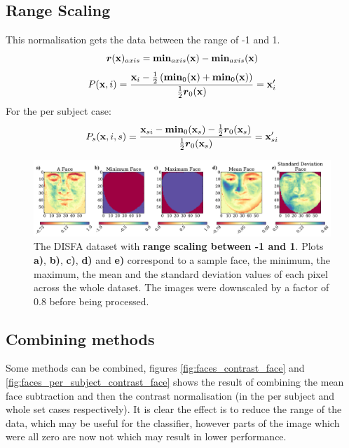     \subsection{Range Scaling}
      This normalisation gets the data between the range of -1 and 1.
      \begin{equation}
        {\boldsymbol r}({\bf x})_{axis} = {\boldsymbol \min}_{axis}({\bf x}) - {\boldsymbol \min}_{axis}({\bf x})
      \end{equation}
      \begin{equation}
         P({\bf x},i) =
         \frac{{\bf x}_{i} - \frac{1}{2}\left ( {\boldsymbol \min}_0({\bf x}) + {\boldsymbol \min}_0({\bf x}) \right ) }{\frac{1}{2}{\boldsymbol r}_0({\bf x})}
         = {\bf x}_{i}'
      \end{equation}
      For the per subject case:
      \begin{equation}
         P_s({\bf x},i,s) =
         \frac{{\bf x}_{si} - {\boldsymbol \min}_0({\bf x}_s) - \frac{1}{2}{\boldsymbol r}_0({\bf x}_s) }{\frac{1}{2}{\boldsymbol r}_0({\bf x}_s)}
         = {\bf x}_{si}'
      \end{equation}
      \begin{figure}[!h] \centering
      \includegraphics[width =\hsize]{figures/faces_range.pdf}
      \caption{The DISFA dataset with {\bf range scaling between -1 and 1}.
      Plots {\bf a)}, {\bf b)}, {\bf c)}, {\bf d)} and {\bf e)}
      correspond to a sample face, the minimum, the maximum,
      the mean and the standard deviation values of each pixel across
      the whole dataset. The images were downscaled by a factor of 0.8 before being processed.}
      \label{fig:simple} \end{figure}

    \subsection{Combining methods}
      Some methods can be combined, figures \ref{fig:faces_contrast_face} and \ref{fig:faces_per_subject_contrast_face}
      shows the result of combining the mean face subtraction and then the
      contrast normalisation (in the per subject and whole set cases respectively). It is clear the effect is to
      reduce the range of the data, which may be useful for the classifier, however parts of the image
      which were all zero are now not which may result in lower performance.


